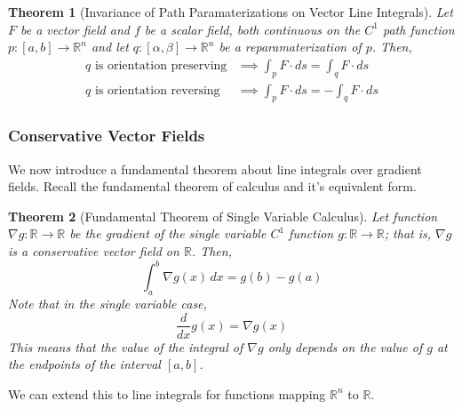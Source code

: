 \documentclass{article}
\newtheorem{theorem}{Theorem}[section]
\theoremstyle{remark}
\theoremstyle{definition}
\begin{document}
\begin{theorem}[Invariance of Path Paramaterizations on Vector Line Integrals]
Let $F$ be a vector field and $f$ be a scalar field, both continuous on the $C^1$ path function $p: [a,b] \longrightarrow \mathbb{R}^n$ and let $q: [\alpha, \beta] \longrightarrow \mathbb{R}^n$ be a reparamaterization of $p$. Then, 
\begin{align*}
    q \text{ is orientation preserving} & \implies \int_p F \cdot d s = \int_q F \cdot d s \\
    q \text{ is orientation reversing} & \implies \int_p F \cdot d s = - \int_q F \cdot d s
\end{align*}
\end{theorem}

\subsubsection{Conservative Vector Fields}
We now introduce a fundamental theorem about line integrals over gradient fields. Recall the fundamental theorem of calculus and it's equivalent form. 

\begin{theorem}[Fundamental Theorem of Single Variable Calculus]
Let function $\nabla g: \mathbb{R} \longrightarrow \mathbb{R}$ be the gradient of the single variable $C^1$ function $g: \mathbb{R} \longrightarrow \mathbb{R}$; that is, $\nabla g$ is a conservative vector field on $\mathbb{R}$. Then, 
\[\int_a^b \nabla g (x) \,dx = g(b) - g(a)\]
Note that in the single variable case, 
\[\frac{d}{dx} g(x) = \nabla g(x)\]
This means that the value of the integral of $\nabla g$ only depends on the value of $g$ at the endpoints of the interval $[a,b]$. 
\end{theorem}

We can extend this to line integrals for functions mapping $\mathbb{R}^n$ to $\mathbb{R}$. 
\end{document}

